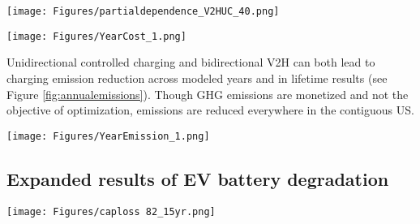 \documentclass[11pt,preprint]{elsarticle}
\begin{document}
\newpage
\begin{figure*}
    \centering
    \texttt{[image: Figures/partialdependence\_V2HUC\_40.png]}
    \caption{Partial dependence plot of cost reduction benefits of V2H compared with uncontrolled charging on selected independent variables from 2040 results and inputs. Random forest algorithm is used to fit the model. Data points involved in this analysis are county medians. The Y-axis denotes the predicted outcome of the fitted model. The smaller the outcome, the higher the savings.}
    \label{fig:40pdp}
\end{figure*}
\newpage

\begin{figure*}
    \centering
    \texttt{[image: Figures/YearCost\_1.png]}
    \caption{Median annual charging costs for individual EVs, of each region across the US. Charging costs are defined as net increase in the electricity bill of the whole home after introducing EV charging. 2024, 2030 and 2040 are modeled annual results. The homes modeled have electrified space heating}
    \label{fig:annualcost}
\end{figure*}
\newpage

Unidirectional controlled charging and bidirectional V2H can both lead to charging emission reduction across modeled years and in lifetime results (see Figure \ref{fig:annualemissions}). Though GHG emissions are monetized and not the objective of optimization, emissions are reduced everywhere in the contiguous US.

\begin{figure*}
    \centering
    \texttt{[image: Figures/YearEmission\_1.png]}
    \caption{Median annual charging GHG emissions for individual EVs, of each region across the US. Charging GHG emissions are defined as net increase in GHG emissions of the whole home after introducing EV charging. 2024, 2030 and 2040 are modeled annual results. The homes modeled have electrified space heating}
    \label{fig:annualemissions}
\end{figure*}

\subsection{Expanded results of EV battery degradation}\label{sec:batdegsi}

\begin{figure*} 
    \centering 
    \texttt{[image: Figures/caploss 82\_15yr.png]} 
    \caption{Local median capacity loss at the end of 15-year EV lifetime of counties across the US, across EV charging behavior cases and across battery models. The battery size of the EV is assumed to be 82kWh.} 
    \label{fig:caploss82} 
\end{figure*}
\end{document}
